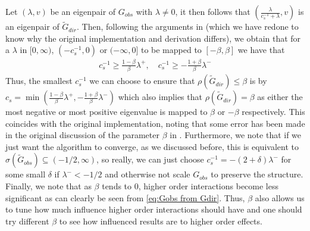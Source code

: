 \documentclass[../Thesis.tex]{subfiles}
\begin{document}
Let $\left(\lambda, v\right)$ be an eigenpair of $G_{obs}$ with $\lambda \neq 0$, it then follows that $\left(\frac{\lambda}{c_s^{-1} + \lambda}, v\right)$ is an eigenpair of $\tilde{G}_{dir}$. Then, following the arguments in \cite{Network-deconvolution-as-a-general-method-to-distinguish-direct-dependencies-in-networks} (which we have redone to know why the original implementation and derivation differs), we obtain that for a $\lambda$ in $[0,\infty)$, $(-c_s^{-1},0)$ or $(-\infty, 0]$ to be mapped to $[-\beta, \beta]$ we have that
\begin{align*}
    c_s^{-1}  \geq \frac{1-\beta}{\beta} \lambda^+,\quad c_s^{-1}  \geq -\frac{1+\beta}{\beta} \lambda^-
\end{align*}
Thus, the smallest $c_s^{-1}$ we can choose to ensure that $\rho\left(\tilde{G}_{dir}\right) \leq \beta$ is by $c_s = \min \left(\frac{1-\beta}{\beta} \lambda^+,-\frac{1+\beta}{\beta} \lambda^- \right)$ which also implies that $\rho\left(\tilde{G}_{dir}\right) = \beta$ as either the most negative or most positive eigenvalue is mapped to $\beta$ or $-\beta$ respectively. This coincides with the original implementation, noting that some error has been made in the original discussion of the parameter $\beta$ in \cite{Network-deconvolution-as-a-general-method-to-distinguish-direct-dependencies-in-networks}. Furthermore, we note that if we just want the algorithm to converge, as we discussed before, this is equivalent to $\sigma\left(\tilde{G}_{obs}\right) \subseteq (-1/2, \infty)$, so really, we can just choose $c_s^{-1} = -(2+\delta) \lambda^-$ for some small $\delta$ if $\lambda^- < -1/2$ and otherwise not scale $G_{obs}$ to preserve the structure. Finally, we note that as $\beta$ tends to $0$, higher order interactions become less significant as can clearly be seen from \autoref{eq:Gobs from Gdir}. Thus, $\beta$ also allows us to tune how much influence higher order interactions should have and one should try different $\beta$ to see how influenced results are to higher order effects.
\end{document}
